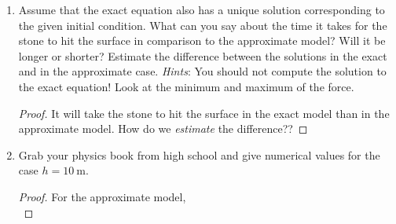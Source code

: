 \documentclass[../notes.tex]{subfiles}
\begin{document}
\begin{enumerate}[label={\textbf{1.\arabic*.}},ref={1.\arabic*},leftmargin=3.5em]
\begin{enumerate}[label={(\roman*)}]
\begin{proof}
            \begin{equation*}
                r(t) = -\frac{1}{2}gt^2+C_1t+C_2
            \end{equation*}
            for some additional $C_2\in\R$. Using the initial conditions, we can determine that
            \begin{align*}
                h &= r(0) = C_2&
                0 &= \dot{r}(0) = v(0) = C_1
            \end{align*}
            Thus, the solution to the approximate system corresponding to the given initial conditions is
            \begin{equation*}
                \boxed{r(t) = -\frac{1}{2}gt^2+h}
            \end{equation*}
            We can solve the equation $r(t)=0$ for $t$ as follows.
            \begin{align*}
                0 &= r(t)\\
                &= -\frac{1}{2}gt^2+h\\
                t &= \pm\sqrt{\frac{2h}{g}}
            \end{align*}
            Knowing that $t\geq 0$ by definition, we choose
            \begin{equation*}
                \boxed{t = \sqrt{\frac{2h}{g}}}
            \end{equation*}
        \end{proof}
        \item Assume that the exact equation also has a unique solution corresponding to the given initial condition. What can you say about the time it takes for the stone to hit the surface in comparison to the approximate model? Will it be longer or shorter? Estimate the difference between the solutions in the exact and in the approximate case. \emph{Hints}: You should not compute the solution to the exact equation! Look at the minimum and maximum of the force.
        \begin{proof}
            It will take the stone  to hit the surface in the exact model than in the approximate model. How do we \emph{estimate} the difference??
        \end{proof}
        \item Grab your physics book from high school and give numerical values for the case $h=\SI{10}{\meter}$.
        \begin{proof}
            For the approximate model,
            \begin{equation*}

\end{equation*}
\end{proof}
\end{enumerate}
\end{enumerate}
\end{document}
